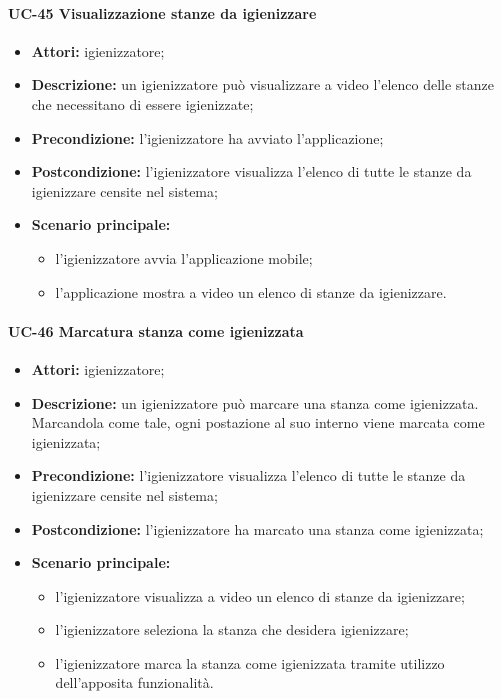 \paragraph{UC-45 Visualizzazione stanze da igienizzare}
\begin{itemize}
    \item \textbf{Attori:} igienizzatore;
    \item \textbf{Descrizione:} un igienizzatore pu\`{o} visualizzare a video l'elenco delle stanze che necessitano di essere igienizzate;
    \item \textbf{Precondizione:} l'igienizzatore ha avviato l'applicazione;
    \item \textbf{Postcondizione:} l'igienizzatore visualizza l'elenco di tutte le stanze da igienizzare censite nel sistema;
    \item \textbf{Scenario principale:}
    \begin{itemize}
        \item l'igienizzatore avvia l'applicazione mobile;
        \item l'applicazione mostra a video un elenco di stanze da igienizzare.
    \end{itemize}
\end{itemize}

\paragraph{UC-46 Marcatura stanza come igienizzata}
\begin{itemize}
    \item \textbf{Attori:} igienizzatore;
    \item \textbf{Descrizione:} un igienizzatore pu\`{o} marcare una stanza come igienizzata. Marcandola come tale, ogni postazione al suo interno viene marcata come igienizzata;
    \item \textbf{Precondizione:} l'igienizzatore visualizza l'elenco di tutte le stanze da igienizzare censite nel sistema;
    \item \textbf{Postcondizione:} l'igienizzatore ha marcato una stanza come igienizzata;
    \item \textbf{Scenario principale:}
    \begin{itemize}
        \item l'igienizzatore visualizza a video un elenco di stanze da igienizzare;
	\item l'igienizzatore seleziona la stanza che desidera igienizzare;
        \item l'igienizzatore marca la stanza come igienizzata tramite utilizzo dell'apposita funzionalità.
    \end{itemize}
\end{itemize}